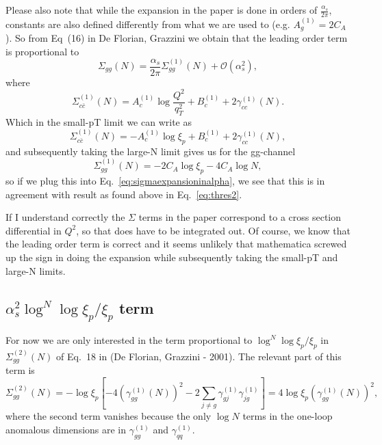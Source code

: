 \documentclass[10pt]{report}
\begin{document}
Please also note that while the expansion in the paper is done in orders of $\frac{\alpha_s}{2\pi}$, constants are also defined differently from what we are used to (e.g. $A^{(1)}_g=2C_A$). So from Eq~(16) in De Florian, Grazzini we obtain that the leading order term is proportional to 
\begin{equation}
\Sigma_{gg}(N) = \frac{\alpha_s}{2\pi} \Sigma^{(1)}_{gg}(N) + \mathcal{O}(\alpha_s^2),
\label{eq:sigmaexpansioninalpha}
\end{equation}
where
\begin{equation}
\Sigma_{c \bar{c}}^{(1)}(N)=A_{c}^{(1)} \log \frac{Q^{2}}{q_{T}^{2}}+B_{c}^{(1)}+2 \gamma_{c c}^{(1)}(N).
\end{equation}
Which in the small-pT limit we can write as
\begin{equation}
\Sigma_{c \bar{c}}^{(1)}(N)= -A_{c}^{(1)} \log \xi_p +B_{c}^{(1)}+2 \gamma_{c c}^{(1)}(N),
\end{equation}
and subsequently taking the large-N limit gives us for the gg-channel
\begin{equation}
\Sigma_{gg}^{(1)}(N)= -2 C_A \log \xi_p - 4 C_A \log N,
\end{equation}
so if we plug this into Eq.~\eqref{eq:sigmaexpansioninalpha}, we see that this is in agreement with result as found above in Eq.~\eqref{eq:thres2}. 

 If I understand correctly the $\Sigma$ terms in the paper correspond to a cross section differential in $Q^2$, so that does have to be integrated out. Of course, we know that the leading order term is correct and it seems unlikely that mathematica screwed up the sign in doing the expansion while subsequently taking the small-pT and large-N limits.



\subsection{$\alpha_s^2 \log^N \log \xi_p / \xi_p$ term }
For now we are only interested in the term proportional to $\log^N \log \xi_p / \xi_p$ in $\Sigma^{(2)}_{gg}(N)$ of Eq.~18 in (De Florian, Grazzini - 2001). The relevant part of this term is
\begin{equation}
\Sigma^{(2)}_{gg}(N) = -\log \xi_p\left[ -4 \left(\gamma^{(1)}_{gg}(N)\right)^2-2\sum_{j\neq g}\gamma^{(1)}_{gj}\gamma^{(1)}_{jg} \right] = 4 \log \xi_p \left(\gamma^{(1)}_{gg}(N)\right)^2,
\label{eq:sigma2ggnolimit}
\end{equation}
where the second term vanishes because the only $\log N$ terms in the one-loop anomalous dimensions are in $\gamma^{(1)}_{gg}$ and $\gamma^{(1)}_{qq}$.
\end{document}
